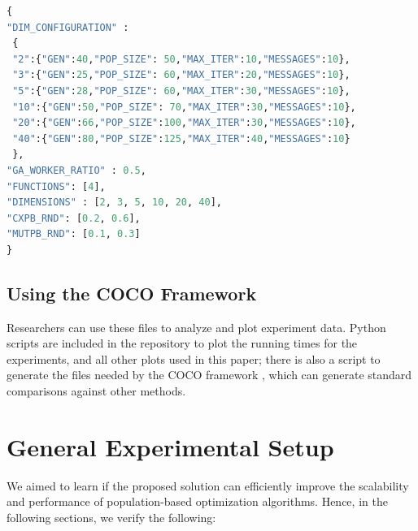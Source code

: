 \documentclass[review]{elsarticle}
\begin{document}
\begin{lstlisting}[language=Python, caption=Experiment definition example, label=code:exp]
{
"DIM_CONFIGURATION" : 
 {
 "2":{"GEN":40,"POP_SIZE": 50,"MAX_ITER":10,"MESSAGES":10},
 "3":{"GEN":25,"POP_SIZE": 60,"MAX_ITER":20,"MESSAGES":10},
 "5":{"GEN":28,"POP_SIZE": 60,"MAX_ITER":30,"MESSAGES":10},
 "10":{"GEN":50,"POP_SIZE": 70,"MAX_ITER":30,"MESSAGES":10},
 "20":{"GEN":66,"POP_SIZE":100,"MAX_ITER":30,"MESSAGES":10},
 "40":{"GEN":80,"POP_SIZE":125,"MAX_ITER":40,"MESSAGES":10}
 },
"GA_WORKER_RATIO" : 0.5,
"FUNCTIONS": [4],
"DIMENSIONS" : [2, 3, 5, 10, 20, 40],
"CXPB_RND": [0.2, 0.6],
"MUTPB_RND": [0.1, 0.3]
}
\end{lstlisting}

\subsection{Using the COCO Framework}

Researchers can use these files to analyze and plot experiment data.  Python
scripts are included in the repository to plot the running times for the
experiments, and all other plots used in this paper;  there is also a script to
generate the files needed by the COCO framework \cite{hansen2016coco}, which can generate standard
comparisons against other methods.


\section{General Experimental Setup} 
\label{setup}

We aimed to learn if the proposed solution can efficiently
improve the scalability and performance of population-based optimization
algorithms. %
Hence, in the following sections, we verify the following:
\end{document}

